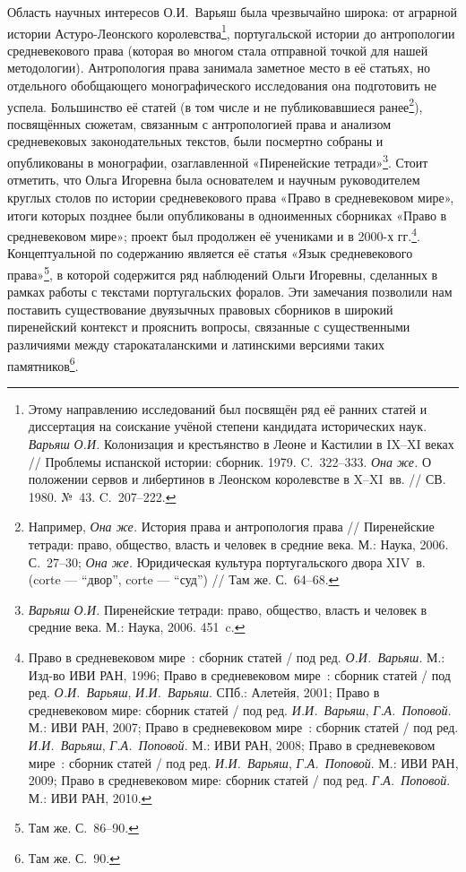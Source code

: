 Область научных интересов О.И.~Варьяш была чрезвычайно широка: от аграрной истории Астуро-Леонского королевства\footnote{Этому направлению исследований был посвящён ряд её ранних статей и диссертация на соискание учёной степени кандидата исторических наук. \emph{Варьяш}\emph{ О.И.} Колонизация и крестьянство в Леоне и Кастилии в IX--XI веках // Проблемы испанской истории: сборник. 1979. C.~322--333. \emph{Она же.} О положении сервов и либертинов в Леонском королевстве в X--XI~вв. // СВ. 1980. №~43. C.~207--222.}, португальской истории до антропологии средневекового права (которая во многом стала отправной точкой для нашей методологии). Антропология права занимала заметное место в её статьях, но отдельного обобщающего монографического исследования она подготовить не успела. Большинство её статей (в том числе и не публиковавшиеся ранее\footnote{Например, \emph{Она же.} История права и антропология права // Пиренейские тетради: право, общество, власть и человек в средние века. М.: Наука, 2006. С.~27--30; \emph{Она же.} Юридическая культура португальского двора XIV~в. (corte --- “двор”, corte --- “суд”) // Там же. С.~64--68.}), посвящённых сюжетам, связанным с антропологией права и анализом средневековых законодательных текстов, были посмертно собраны и опубликованы в монографии, озаглавленной «Пиренейские тетради»\footnote{\emph{Варьяш}\emph{ О.И.} Пиренейские тетради: право, общество, власть и человек в средние века. М.: Наука, 2006. 451~c.}. Стоит отметить, что Ольга Игоревна была основателем и научным руководителем круглых столов по истории средневекового права «Право в средневековом мире», итоги которых позднее были опубликованы в одноименных сборниках «Право в средневековом мире»; проект был продолжен её учениками и  в 2000-х гг.\footnote{Право в средневековом мире~: сборник статей / под ред. \emph{О.И.~Варьяш}. М.: Изд-во ИВИ РАН, 1996; Право в средневековом мире~: сборник статей / под ред. \emph{О.И.~Варьяш}, \emph{И.И.~Варьяш}. СПб.: Алетейя, 2001; Право в средневековом мире: сборник статей / под ред. \emph{И.И.~Варьяш}, \emph{Г.А.~Поповой}. М.: ИВИ РАН, 2007; Право в средневековом мире~: сборник статей / под ред. \emph{И.И.~Варьяш}, \emph{Г.А.~Поповой}. М.: ИВИ РАН, 2008; Право в средневековом мире~: сборник статей / под ред. \emph{И.И.~Варьяш}, \emph{Г.А.~Поповой}. М.: ИВИ РАН, 2009; Право в средневековом мире: сборник статей / под ред. \emph{Г.А.~Поповой}. М.: ИВИ РАН, 2010.}. Концептуальной по содержанию является её статья «Язык средневекового права»\footnote{Там же. С.~86--90.}, в которой содержится ряд наблюдений Ольги Игоревны, сделанных в рамках работы с текстами португальских форалов. Эти замечания позволили нам поставить существование двуязычных правовых сборников в широкий пиренейский контекст и прояснить вопросы, связанные с существенными различиями между старокаталанскими и латинскими версиями таких памятников\footnote{Там же. С.~90.}.

